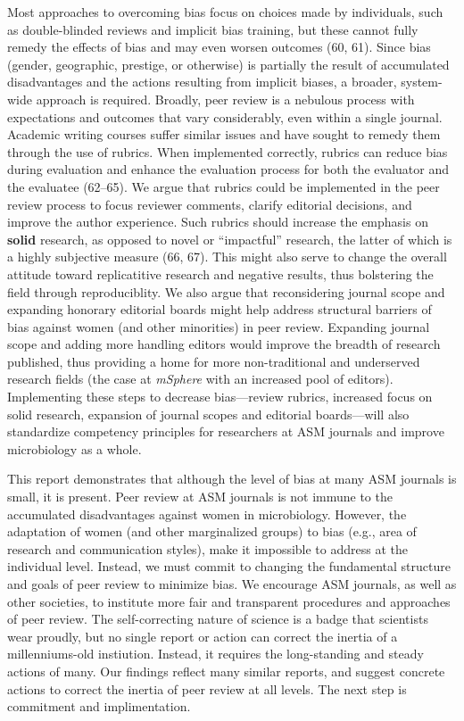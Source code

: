 \documentclass[11pt,]{article}
\begin{document}
Most approaches to overcoming bias focus on choices made by individuals,
such as double-blinded reviews and implicit bias training, but these
cannot fully remedy the effects of bias and may even worsen outcomes
(60, 61). Since bias (gender, geographic, prestige, or otherwise) is
partially the result of accumulated disadvantages and the actions
resulting from implicit biases, a broader, system-wide approach is
required. Broadly, peer review is a nebulous process with expectations
and outcomes that vary considerably, even within a single journal.
Academic writing courses suffer similar issues and have sought to remedy
them through the use of rubrics. When implemented correctly, rubrics can
reduce bias during evaluation and enhance the evaluation process for
both the evaluator and the evaluatee (62--65). We argue that rubrics
could be implemented in the peer review process to focus reviewer
comments, clarify editorial decisions, and improve the author
experience. Such rubrics should increase the emphasis on \textbf{solid}
research, as opposed to novel or ``impactful'' research, the latter of
which is a highly subjective measure (66, 67). This might also serve to
change the overall attitude toward replicatitive research and negative
results, thus bolstering the field through reproduciblity. We also argue
that reconsidering journal scope and expanding honorary editorial boards
might help address structural barriers of bias against women (and other
minorities) in peer review. Expanding journal scope and adding more
handling editors would improve the breadth of research published, thus
providing a home for more non-traditional and underserved research
fields (the case at \emph{mSphere} with an increased pool of editors).
Implementing these steps to decrease bias---review rubrics, increased
focus on solid research, expansion of journal scopes and editorial
boards---will also standardize competency principles for researchers at
ASM journals and improve microbiology as a whole.

This report demonstrates that although the level of bias at many ASM
journals is small, it is present. Peer review at ASM journals is not
immune to the accumulated disadvantages against women in microbiology.
However, the adaptation of women (and other marginalized groups) to bias
(e.g., area of research and communication styles), make it impossible to
address at the individual level. Instead, we must commit to changing the
fundamental structure and goals of peer review to minimize bias. We
encourage ASM journals, as well as other societies, to institute more
fair and transparent procedures and approaches of peer review. The
self-correcting nature of science is a badge that scientists wear
proudly, but no single report or action can correct the inertia of a
millenniums-old instiution. Instead, it requires the long-standing and
steady actions of many. Our findings reflect many similar reports, and
suggest concrete actions to correct the inertia of peer review at all
levels. The next step is commitment and implimentation.
\end{document}
